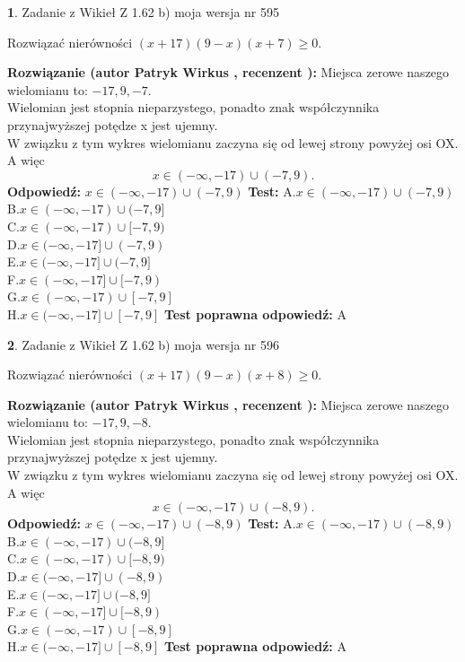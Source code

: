 \documentclass[12pt, a4paper]{article}
\theoremstyle{definition} %
\newtheorem{zad}{}
\newcommand{\zadStart}[1]{\begin{zad}#1\newline}
\newcommand{\zadStop}{\end{zad}}
\newcommand{\rozwStart}[2]{\noindent \textbf{Rozwiązanie (autor #1 , recenzent #2): }\newline}
\newcommand{\rozwStop}{\newline}
\newcommand{\odpStart}{\noindent \textbf{Odpowiedź:}\newline}
\newcommand{\odpStop}{\newline}
\newcommand{\testStart}{\noindent \textbf{Test:}\newline}
\newcommand{\testStop}{\newline}
\newcommand{\kluczStart}{\noindent \textbf{Test poprawna odpowiedź:}\newline}
\newcommand{\kluczStop}{\newline}
\begin{document}
\zadStart{Zadanie z Wikieł Z 1.62 b) moja wersja nr 595}

Rozwiązać nierówności $(x+17)(9-x)(x+7)\ge0$.
\zadStop
\rozwStart{Patryk Wirkus}{}
Miejsca zerowe naszego wielomianu to: $-17, 9, -7$.\\
Wielomian jest stopnia nieparzystego, ponadto znak współczynnika przy\linebreak najwyższej potędze x jest ujemny.\\ W związku z tym wykres wielomianu zaczyna się od lewej strony powyżej osi OX. A więc $$x \in (-\infty,-17) \cup (-7,9).$$
\rozwStop
\odpStart
$x \in (-\infty,-17) \cup (-7,9)$
\odpStop
\testStart
A.$x \in (-\infty,-17) \cup (-7,9)$\\
B.$x \in (-\infty,-17) \cup (-7,9]$\\
C.$x \in (-\infty,-17) \cup [-7,9)$\\
D.$x \in (-\infty,-17] \cup (-7,9)$\\
E.$x \in (-\infty,-17] \cup (-7,9]$\\
F.$x \in (-\infty,-17] \cup [-7,9)$\\
G.$x \in (-\infty,-17) \cup [-7,9]$\\
H.$x \in (-\infty,-17] \cup [-7,9]$
\testStop
\kluczStart
A
\kluczStop



\zadStart{Zadanie z Wikieł Z 1.62 b) moja wersja nr 596}

Rozwiązać nierówności $(x+17)(9-x)(x+8)\ge0$.
\zadStop
\rozwStart{Patryk Wirkus}{}
Miejsca zerowe naszego wielomianu to: $-17, 9, -8$.\\
Wielomian jest stopnia nieparzystego, ponadto znak współczynnika przy\linebreak najwyższej potędze x jest ujemny.\\ W związku z tym wykres wielomianu zaczyna się od lewej strony powyżej osi OX. A więc $$x \in (-\infty,-17) \cup (-8,9).$$
\rozwStop
\odpStart
$x \in (-\infty,-17) \cup (-8,9)$
\odpStop
\testStart
A.$x \in (-\infty,-17) \cup (-8,9)$\\
B.$x \in (-\infty,-17) \cup (-8,9]$\\
C.$x \in (-\infty,-17) \cup [-8,9)$\\
D.$x \in (-\infty,-17] \cup (-8,9)$\\
E.$x \in (-\infty,-17] \cup (-8,9]$\\
F.$x \in (-\infty,-17] \cup [-8,9)$\\
G.$x \in (-\infty,-17) \cup [-8,9]$\\
H.$x \in (-\infty,-17] \cup [-8,9]$
\testStop
\kluczStart
A
\kluczStop
\end{document}
